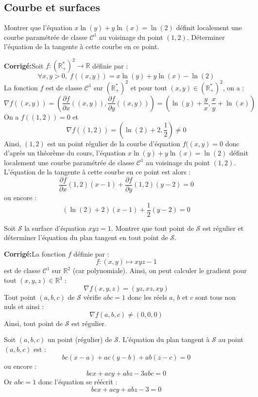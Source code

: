 \documentclass[a4paper,twoside,french,11pt]{VcCours}
\newcommand{\corr}{\textbf{Corrigé:}}
\begin{document}
\subsection{Courbe et surfaces}


\begin{Exercice}{} Montrer que l'équation $x\ln(y)+y \ln(x) = \ln(2)$ définit localement une courbe paramétrée de classe $\mathcal{C}^1$ au voisinage du point $(1,2)$. Déterminer l'équation de la tangente à cette courbe en ce point.
\end{Exercice}

\corr Soit $f : (\mathbb{R}_+^*)^2 \rightarrow \mathbb{R}$ définie par :
$$ \forall x,y>0, \; f((x,y))= x\ln(y)+y \ln(x) - \ln(2)$$
La fonction $f$ est de classe $\mathcal{C}^1$ sur  $(\mathbb{R}_+^*)^2$ et pour tout $(x,y) \in  (\mathbb{R}_+^*)^2$, on a :
$$ \nabla f ((x,y)) = \left( \dfrac{\partial f}{\partial x} ((x,y)),  \dfrac{\partial f}{\partial y} ((x,y)) \right) = \left( \ln(y) + \dfrac{y}{x}, \dfrac{x}{y} + \ln(x) \right)$$
On a $f((1,2))= 0$ et
$$ \nabla f ((1,2)) = \left( \ln(2)+2, \dfrac{1}{2} \right) \neq 0$$
Ainsi, $(1,2)$ est un point régulier de la courbe d'équation $f((x,y)=0$ donc d'après un théorème du cours, l'équation $x\ln(y)+y \ln(x) = \ln(2)$ définit localement une courbe paramétrée de classe $\mathcal{C}^1$ au voisinage du point $(1,2)$. L'équation de la tangente à cette courbe en ce point est alors :
$$  \dfrac{\partial f}{\partial  x}(1,2)(x-1) + \dfrac{\partial f}{\partial y}(1,2) (y-2)=0$$
ou encore :
$$  (\ln(2)+2) (x-1) + \dfrac{1}{2} (y-2)=0$$

\begin{Exercice}{} Soit $\mathcal{S}$ la surface d'équation $xyz=1$. Montrer que tout point de $\mathcal{S}$ est régulier et déterminer l'équation du plan tangent en tout point de $\mathcal{S}$.
\end{Exercice}

\corr La fonction $f$ définie par :
$$ f : (x,y) \mapsto xyz-1$$
est de classe $\mathcal{C}^1$ sur $\mathbb{R}^2$ (car polynomiale). Ainsi, on peut calculer le gradient pour tout $(x,y,z) \in \mathbb{R}^3$ :
$$ \nabla f(x,y,z)=(yz,xz,xy)$$
Tout point $(a,b,c)$ de $\mathcal{S}$ vérifie $abc=1$ donc les réels $a$, $b$ et $c$ sont tous non nuls et ainsi :
$$  \nabla f(a,b,c) \neq (0,0,0)$$
Ainsi, tout point de $\mathcal{S}$ est régulier. 


Soit $(a,b,c)$ un point (régulier) de $\mathcal{S}$. L'équation du plan tangent à $\mathcal{S}$ au point $(a,b,c)$ est :
$$ bc(x-a)+ac(y-b)+ab(z-c)=0$$
ou encore :
$$ bcx+acy+abz -3abc=0$$
Or $abc=1$ donc l'équation se réécrit :
$$ bcx+acy+abz -3=0$$
\end{document}

